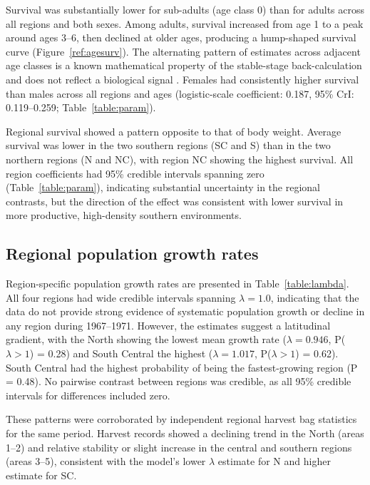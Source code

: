 \documentclass[12pt, a4paper]{article}
\begin{document}
Survival was substantially lower for sub-adults (age class 0) than for adults across all regions and both sexes. Among adults, survival increased from age 1 to a peak around ages 3--6, then declined at older ages, producing a hump-shaped survival curve (Figure~\ref{ref:agesurv}). The alternating pattern of estimates across adjacent age classes is a known mathematical property of the stable-stage back-calculation and does not reflect a biological signal \citep{skellyFlexibleBayesianApproach2023}. Females had consistently higher survival than males across all regions and ages (logistic-scale coefficient: 0.187, 95\% CrI: 0.119--0.259; Table~\ref{table:param}).

Regional survival showed a pattern opposite to that of body weight. Average survival was lower in the two southern regions (SC and S) than in the two northern regions (N and NC), with region NC showing the highest survival. All region coefficients had 95\% credible intervals spanning zero (Table~\ref{table:param}), indicating substantial uncertainty in the regional contrasts, but the direction of the effect was consistent with lower survival in more productive, high-density southern environments.

\subsection*{Regional population growth rates}

Region-specific population growth rates are presented in Table~\ref{table:lambda}. All four regions had wide credible intervals spanning $\lambda = 1.0$, indicating that the data do not provide strong evidence of systematic population growth or decline in any region during 1967--1971. However, the estimates suggest a latitudinal gradient, with the North showing the lowest mean growth rate ($\lambda = 0.946$, P($\lambda > 1$) = 0.28) and South Central the highest ($\lambda = 1.017$, P($\lambda > 1$) = 0.62). South Central had the highest probability of being the fastest-growing region (P = 0.48). No pairwise contrast between regions was credible, as all 95\% credible intervals for differences included zero.

These patterns were corroborated by independent regional harvest bag statistics for the same period. Harvest records showed a declining trend in the North (areas 1--2) and relative stability or slight increase in the central and southern regions (areas 3--5), consistent with the model's lower $\lambda$ estimate for N and higher estimate for SC.
\end{document}
